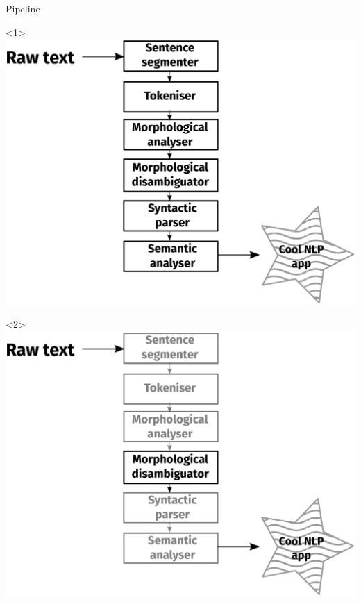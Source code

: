 \documentclass{beamer}
\begin{document}
\begin{frame}{Pipeline}

\begin{onlyenv}<1>
\includegraphics[width=\textwidth]{images/pipeline.eps}
\end{onlyenv}
\begin{onlyenv}<2>
\includegraphics[width=\textwidth]{images/pipeline-4.eps}
\end{onlyenv}

\end{frame}
\end{document}
